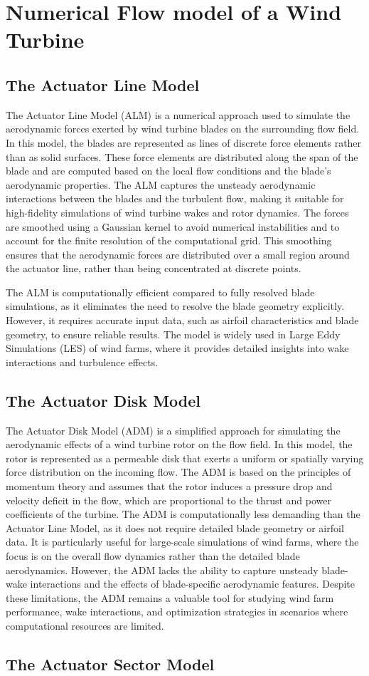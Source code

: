 \section{Numerical Flow model of a Wind Turbine}
\subsection{The Actuator Line Model} 

The Actuator Line Model (ALM) is a numerical approach used to simulate the aerodynamic forces exerted by wind turbine blades on the surrounding flow field. In this model, the blades are represented as lines of discrete force elements rather than as solid surfaces. These force elements are distributed along the span of the blade and are computed based on the local flow conditions and the blade's aerodynamic properties. The ALM captures the unsteady aerodynamic interactions between the blades and the turbulent flow, making it suitable for high-fidelity simulations of wind turbine wakes and rotor dynamics. The forces are smoothed using a Gaussian kernel to avoid numerical instabilities and to account for the finite resolution of the computational grid. This smoothing ensures that the aerodynamic forces are distributed over a small region around the actuator line, rather than being concentrated at discrete points.

The ALM is computationally efficient compared to fully resolved blade simulations, as it eliminates the need to resolve the blade geometry explicitly. However, it requires accurate input data, such as airfoil characteristics and blade geometry, to ensure reliable results. The model is widely used in Large Eddy Simulations (LES) of wind farms, where it provides detailed insights into wake interactions and turbulence effects.
\subsection{The Actuator Disk Model} 
The Actuator Disk Model (ADM) is a simplified approach for simulating the aerodynamic effects of a wind turbine rotor on the flow field. In this model, the rotor is represented as a permeable disk that exerts a uniform or spatially varying force distribution on the incoming flow. The ADM is based on the principles of momentum theory and assumes that the rotor induces a pressure drop and velocity deficit in the flow, which are proportional to the thrust and power coefficients of the turbine. The ADM is computationally less demanding than the Actuator Line Model, as it does not require detailed blade geometry or airfoil data. It is particularly useful for large-scale simulations of wind farms, where the focus is on the overall flow dynamics rather than the detailed blade aerodynamics. However, the ADM lacks the ability to capture unsteady blade-wake interactions and the effects of blade-specific aerodynamic features. Despite these limitations, the ADM remains a valuable tool for studying wind farm performance, wake interactions, and optimization strategies in scenarios where computational resources are limited.
\subsection{The Actuator Sector Model} 


